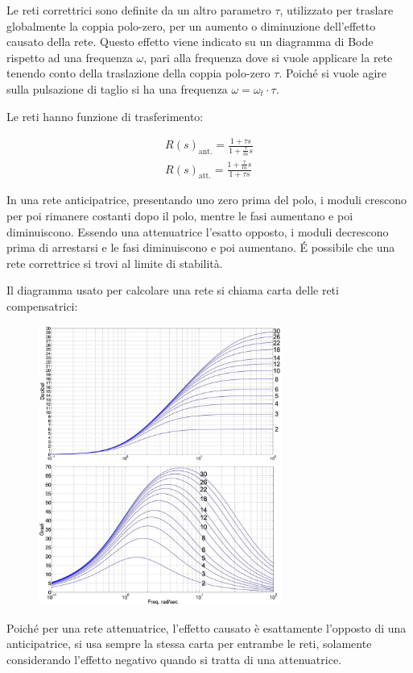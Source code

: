 \documentclass{article}
\numberwithin{equation}{subsection}
\begin{document}
Le reti correttrici sono definite da un altro parametro $\tau$, utilizzato per traslare globalmente la coppia polo-zero, per un aumento o diminuzione dell'effetto 
causato della rete. Questo effetto viene indicato su un diagramma di Bode rispetto ad una frequenza $\omega$, pari alla frequenza dove si vuole applicare la rete tenendo 
conto della traslazione della coppia polo-zero $\tau$. Poiché si vuole agire sulla pulsazione di taglio si ha una frequenza $\omega=\omega_t\cdot\tau$. 

Le reti hanno funzione di trasferimento: 

\begin{gather}
    R(s)_\mathrm{ant.}=\displaystyle\frac{1+\tau s}{1+\displaystyle\frac{\tau}{m}s}\\
    R(s)_\mathrm{att.}=\displaystyle\frac{1+\displaystyle\frac{\tau}{m}s}{1+\tau s}
\end{gather}

In una rete anticipatrice, presentando uno zero prima del polo, i moduli crescono per poi rimanere costanti dopo il polo, mentre le fasi aumentano e poi diminuiscono. Essendo 
una attenuatrice l'esatto opposto, i moduli decrescono prima di arrestarsi e le fasi diminuiscono e poi aumentano. 
\'{E} possibile che una rete correttrice si trovi al limite di stabilità. 


Il diagramma usato per calcolare una rete si chiama carta delle reti compensatrici: 
\begin{figure}[H]%
    \centering
    \includegraphics[width=8cm]{CartaReti.jpg}%
\end{figure}

Poiché per una rete attenuatrice, l'effetto causato è esattamente l'opposto di una anticipatrice, si usa sempre la stessa carta per entrambe le reti, solamente considerando 
l'effetto negativo quando si tratta di una attenuatrice. 
\end{document}
